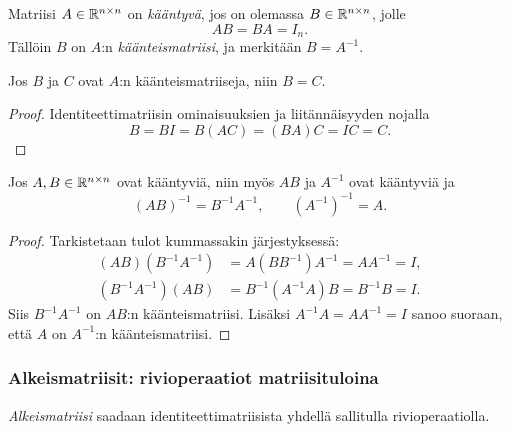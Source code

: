 \documentclass[11pt,a4paper]{amsart}
\begin{document}
  \begin{definition}[Käänteismatriisi]
    Matriisi $A\in\mathbb{R}^{n\times n}$ on \emph{kääntyvä}, jos on olemassa
    $B\in\mathbb{R}^{n\times n}$, jolle
    \[
      AB=BA=I_n.
    \]
    Tällöin $B$ on $A$:n \emph{käänteismatriisi}, ja merkitään $B=A^{-1}$.
  \end{definition}

  \begin{lemma}
    Jos $B$ ja $C$ ovat $A$:n käänteismatriiseja, niin $B=C$.
  \end{lemma}
  \begin{proof}
    Identiteettimatriisin ominaisuuksien ja liitännäisyyden nojalla
    \[
      B=BI=B(AC)=(BA)C=IC=C.
    \]
  \end{proof}

  \begin{theorem}\label{thm:inverse-product}
    Jos $A,B\in\mathbb{R}^{n\times n}$ ovat kääntyviä, niin myös $AB$ ja
    $A^{-1}$ ovat kääntyviä ja
    \[
      \boxed{(AB)^{-1}=B^{-1}A^{-1},\qquad (A^{-1})^{-1}=A.}
    \]
  \end{theorem}
  \begin{proof}
    Tarkistetaan tulot kummassakin järjestyksessä:
    \begin{align*}
      (AB)(B^{-1}A^{-1})&=A(BB^{-1})A^{-1}=AA^{-1}=I,\\
      (B^{-1}A^{-1})(AB)&=B^{-1}(A^{-1}A)B=B^{-1}B=I.
    \end{align*}
    Siis $B^{-1}A^{-1}$ on $AB$:n käänteismatriisi. Lisäksi
    $A^{-1}A=AA^{-1}=I$ sanoo suoraan, että $A$ on $A^{-1}$:n
    käänteismatriisi.
  \end{proof}

  \subsubsection*{Alkeismatriisit: rivioperaatiot matriisituloina}

  \begin{definition}[Alkeismatriisi]
    \emph{Alkeismatriisi} saadaan identiteettimatriisista yhdellä
    sallitulla rivioperaatiolla.
  \end{definition}
\end{document}
